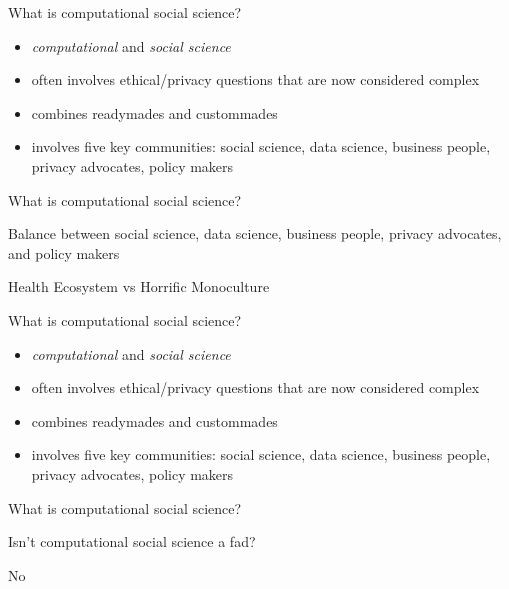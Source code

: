 \documentclass{beamer}
\def\vf{\vfill}
\begin{document}
\begin{frame}{What is computational social science?}

\begin{itemize}
\item \emph{computational} and \emph{social science}
\item often involves ethical/privacy questions that are now considered complex
\item combines readymades and custommades
\item involves five key communities: social science, data science, business people, privacy advocates, policy makers
\end{itemize}

\end{frame}
\begin{frame}{What is computational social science?}

\begin{center}
Balance between social science, data science, business people, privacy advocates, and policy makers\\
\end{center}
\vf
\begin{center}
Health Ecosystem vs Horrific Monoculture
\end{center}

\end{frame}
\begin{frame}{What is computational social science?}


\begin{itemize}
\item \emph{computational} and \emph{social science}
\item often involves ethical/privacy questions that are now considered complex
\item combines readymades and custommades
\item involves five key communities: social science, data science, business people, privacy advocates, policy makers
\end{itemize}

\end{frame}
\begin{frame}{What is computational social science?}

\begin{center}
\LARGE{Isn't computational social science a fad?}
\end{center}

\pause
\begin{center}
	No
\end{center}


\end{frame}
\end{document}
